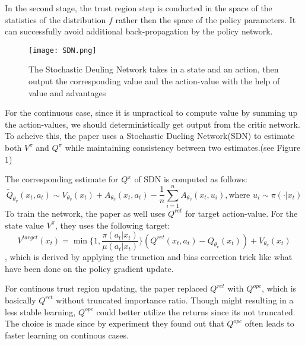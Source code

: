 In the second stage, the trust region step is conducted in the space of the statistics of the distribution $f$ rather then the space of the policy parameters. 
It can successfully avoid additional back-propagation by the policy network.

\begin{figure}
\caption{The Stochastic Deuling Network takes in a state and an action, 
then output the corresponding value and the action-value with the help of value and advantages}
\texttt{[image: SDN.png]}
\end{figure}

For the continuous case, since it is unpractical to compute value by summing up the action-values, 
we should deterministically get output from the critic network.
To acheive this, the paper uses a Stochastic Dueling Network(SDN) to estimate both $V^\pi$ and $Q^\pi$
while maintaining consistency between two estimates.(see Figure 1)

The corresponding estimate for $Q^\pi$ of SDN is computed as follows:
\[
  \tilde{Q}_{\theta_v}(x_t, a_t) \sim V_{\theta_v}(x_t) + A_{\theta_v}(x_t, a_t) - \frac{1}{n}\sum_{i = 1}^n A_{\theta_v}(x_t, u_i), \text{where } u_i \sim \pi(\cdot | x_t)
\]
To train the network, the paper as well uses $Q^{ret}$ for target action-value.
For the state value $V^\pi$, they uses the following target:
\[
    V^{target}(x_t) = \min\{1, \frac{\pi(a_t|x_t)}{\mu(a_t | x_t)}\} (Q^{ret}(x_t, a_t) - Q_{\theta_v}(x_t)) + V_{\theta_v}(x_t)
\]
, which is derived by applying the trunction and bias correction trick like what have been done on the policy gradient update.

For continous trust region updating, the paper replaced $Q^{ret}$ with $Q^{opc}$, 
which is basically $Q^{ret}$ without truncated importance ratio.
Though might resulting in a less stable learning, $Q^{opc}$ could better utilize the returns since its not truncated.
The choice is made since by experiment they found out that $Q^{opc}$ often leads to faster learning on continous cases.
